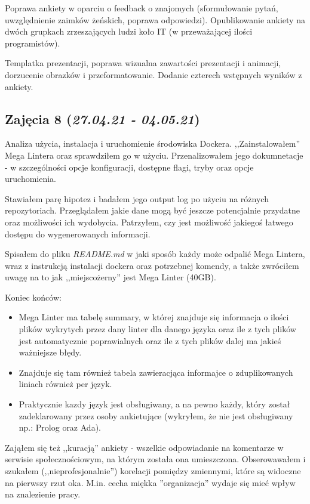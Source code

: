 \documentclass[graybox]{svmult}
\begin{document}
Poprawa ankiety w oparciu o feedback o znajomych (sformułowanie pytań, uwzględnienie zaimków żeńskich, poprawa odpowiedzi). Opublikowanie ankiety na dwóch grupkach zrzeszających ludzi koło IT (w przeważającej ilości programistów). 

Templatka prezentacji, poprawa wizualna zawartości prezentacji i animacji, dorzucenie obrazków i przeformatowanie. Dodanie czterech wstępnych wyników z ankiety.

\subsection{Zajęcia 8 (\emph{27.04.21 - 04.05.21})}

Analiza użycia, instalacja i uruchomienie środowiska Dockera. ,,Zainstalowałem'' Mega Lintera oraz sprawdziłem go w użyciu. Przenalizowałem jego dokumnetacje - w szczególności opcje konfiguracji, dostępne flagi, tryby oraz opcje uruchomienia.

Stawiałem parę hipotez i badałem jego output log po użyciu na różnych repozytoriach. Przeglądałem jakie dane mogą być jeszcze potencjalnie przydatne oraz możliwości ich wydobycia. Patrzyłem, czy jest możliwość jakiegoś łatwego dostępu do wygenerowanych informacji. 

Spisałem do pliku \emph{README.md} w jaki sposób każdy może odpalić Mega Lintera, wraz z instrukcją instalacji dockera oraz potrzebnej komendy, a także zwróciłem uwagę na to jak ,,miejscożerny'' jest Mega Linter (40GB). 

Koniec końców:

\begin{itemize}
  \item Mega Linter ma tabelę summary, w której znajduje się informacja o ilości plików wykrytych przez dany linter dla danego języka oraz ile z tych plików jest automatycznie poprawialnych oraz ile z tych plików dalej ma jakieś ważniejsze błędy.
  \item Znajduje się tam również tabela zawieracjąca informajce o zduplikowanych liniach również per język.
  \item Praktycznie kazdy język jest obsługiwany, a na pewno każdy, który został zadeklarowany przez osoby ankietujące (wykryłem, że nie jest obsługiwany np.: Prolog oraz Ada).
\end{itemize}

Zająłem się też ,,kuracją'' ankiety - wszelkie odpowiadanie na komentarze w serwisie społecznościowym, na którym została ona umieszczona. Obserowawałem i szukałem (,,nieprofesjonalnie'') korelacji pomiędzy zmiennymi, które są widoczne na pierwszy rzut oka. M.in. cecha miękka ''organizacja'' wydaje się mieć wpływ na znalezienie pracy.
\end{document}
